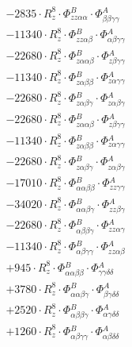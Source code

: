 \documentclass{article}
\begin{document}
\begin{subequations}
\begin{gather}
\begin{array}{c}
 \\[0.2em] 		 - 2835 \cdot R_{z}^{8} \cdot \Phi{}^{B}_{zz\alpha{}\alpha{}} \cdot \Phi{}^{A}_{\beta{}\beta{}\gamma{}\gamma{}} 
 \\[0.2em] 		 - 11340 \cdot R_{z}^{8} \cdot \Phi{}^{B}_{zz\alpha{}\beta{}} \cdot \Phi{}^{A}_{\alpha{}\beta{}\gamma{}\gamma{}} 
 \\[0.2em] 		 - 22680 \cdot R_{z}^{8} \cdot \Phi{}^{B}_{z\alpha{}\alpha{}\beta{}} \cdot \Phi{}^{A}_{z\beta{}\gamma{}\gamma{}} 
 \\[0.2em] 		 - 11340 \cdot R_{z}^{8} \cdot \Phi{}^{B}_{z\alpha{}\beta{}\beta{}} \cdot \Phi{}^{A}_{z\alpha{}\gamma{}\gamma{}} 
 \\[0.2em] 		 - 22680 \cdot R_{z}^{8} \cdot \Phi{}^{B}_{z\alpha{}\beta{}\gamma{}} \cdot \Phi{}^{A}_{z\alpha{}\beta{}\gamma{}} 
 \\[0.2em] 		 - 22680 \cdot R_{z}^{8} \cdot \Phi{}^{B}_{z\alpha{}\alpha{}\beta{}} \cdot \Phi{}^{A}_{z\beta{}\gamma{}\gamma{}} 
 \\[0.2em] 		 - 11340 \cdot R_{z}^{8} \cdot \Phi{}^{B}_{z\alpha{}\beta{}\beta{}} \cdot \Phi{}^{A}_{z\alpha{}\gamma{}\gamma{}} 
 \\[0.2em] 		 - 22680 \cdot R_{z}^{8} \cdot \Phi{}^{B}_{z\alpha{}\beta{}\gamma{}} \cdot \Phi{}^{A}_{z\alpha{}\beta{}\gamma{}} 
 \\[0.2em] 		 - 17010 \cdot R_{z}^{8} \cdot \Phi{}^{B}_{\alpha{}\alpha{}\beta{}\beta{}} \cdot \Phi{}^{A}_{zz\gamma{}\gamma{}} 
 \\[0.2em] 		 - 34020 \cdot R_{z}^{8} \cdot \Phi{}^{B}_{\alpha{}\alpha{}\beta{}\gamma{}} \cdot \Phi{}^{A}_{zz\beta{}\gamma{}} 
 \\[0.2em] 		 - 22680 \cdot R_{z}^{8} \cdot \Phi{}^{B}_{\alpha{}\beta{}\beta{}\gamma{}} \cdot \Phi{}^{A}_{zz\alpha{}\gamma{}} 
 \\[0.2em] 		 - 11340 \cdot R_{z}^{8} \cdot \Phi{}^{B}_{\alpha{}\beta{}\gamma{}\gamma{}} \cdot \Phi{}^{A}_{zz\alpha{}\beta{}} 
 \\[0.2em] 		 + 945 \cdot R_{z}^{8} \cdot \Phi{}^{B}_{\alpha{}\alpha{}\beta{}\beta{}} \cdot \Phi{}^{A}_{\gamma{}\gamma{}\delta{}\delta{}} 
 \\[0.2em] 		 + 3780 \cdot R_{z}^{8} \cdot \Phi{}^{B}_{\alpha{}\alpha{}\beta{}\gamma{}} \cdot \Phi{}^{A}_{\beta{}\gamma{}\delta{}\delta{}} 
 \\[0.2em] 		 + 2520 \cdot R_{z}^{8} \cdot \Phi{}^{B}_{\alpha{}\beta{}\beta{}\gamma{}} \cdot \Phi{}^{A}_{\alpha{}\gamma{}\delta{}\delta{}} 
 \\[0.2em] 		 + 1260 \cdot R_{z}^{8} \cdot \Phi{}^{B}_{\alpha{}\beta{}\gamma{}\gamma{}} \cdot \Phi{}^{A}_{\alpha{}\beta{}\delta{}\delta{}} 

\end{array}
\end{gather}
\end{subequations}
\end{document}
